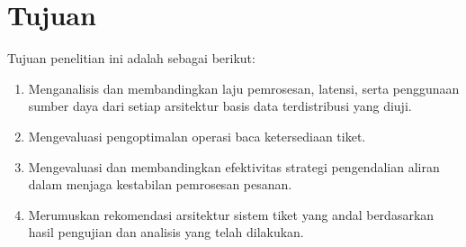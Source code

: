 \pagebreak

\section{Tujuan}

Tujuan penelitian ini adalah sebagai berikut:

\begin{enumerate}
    \item Menganalisis dan membandingkan laju pemrosesan, latensi, serta penggunaan sumber daya dari setiap arsitektur basis data terdistribusi yang diuji.
    \item Mengevaluasi pengoptimalan operasi baca ketersediaan tiket.
    \item Mengevaluasi dan membandingkan efektivitas strategi pengendalian aliran dalam menjaga kestabilan pemrosesan pesanan.
    \item Merumuskan rekomendasi arsitektur sistem tiket yang andal berdasarkan hasil pengujian dan analisis yang telah dilakukan.
\end{enumerate}
